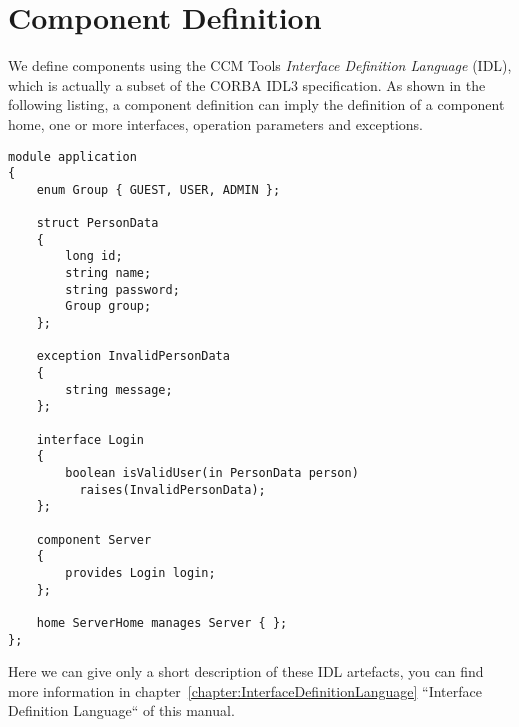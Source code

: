\section{Component Definition}
\label{section:ComponentDefinition}

We define components using the CCM Tools {\it Interface Definition Language}
(IDL), which is actually a subset of the CORBA IDL3 specification.
As shown in the following listing, a component definition can imply the
definition of a component home, one or more interfaces, operation parameters and
exceptions. 

\begin{lstlisting}[language=IDL]
module application
{
    enum Group { GUEST, USER, ADMIN };

    struct PersonData
    {
        long id;
        string name;
        string password;
        Group group;
    };

    exception InvalidPersonData
    {
        string message;
    };

    interface Login
    {
        boolean isValidUser(in PersonData person)
          raises(InvalidPersonData);
    };

    component Server
    {
        provides Login login; 
    };

    home ServerHome manages Server { };
};
\end{lstlisting}

\newpage

Here we can give only a short description of these IDL artefacts, you can find 
more information in chapter~\ref{chapter:InterfaceDefinitionLanguage} 
``Interface Definition Language`` of this manual.

